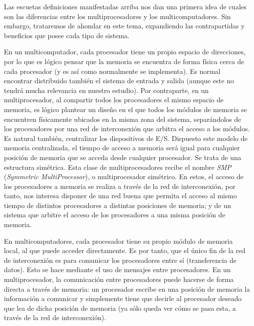 Las escuetas definiciones manifestadas arriba nos dan una primera idea de cuales son las diferencias entre los multiprocesadores y los multicomputadores. Sin embargo, trataremos de ahondar en este tema, expandiendo las contrapartidas y beneficios que posee cada tipo de sistema.

En un multicomputador, cada procesador tiene un propio espacio de direcciones, por lo que es lógico pensar que la memoria se encuentra de forma física cerca de cada procesador (y es así como normalmente se implementa). Es normal encontrar distribuido también el sistema de entrada y salida (aunque este no tendrá mucha relevancia en nuestro estudio). Por contraparte, en un multiprocesador, al compartir todos los procesadores el mismo espacio de memoria, es lógico plantear un diseño en el que todos los módulos de memoria se encuentren físicamente ubicados en la misma zona del sistema, separándolos de los procesadores por una red de interconexión que arbitra el acceso a los módulos. Es natural también, centralizar los dispositivos de E/S. Dispuesto este modelo de memoria centralizada, el tiempo de acceso a memoria será igual para cualquier posición de memoria que se acceda desde cualquier procesador. Se trata de una estructura simétrica. Esta clase de multiprocesadores recibe el nombre \emph{SMP} (\emph{Symmetric MultiProcessor}), o multiprocesador simétrico. En estos, el acceso de los procesadores a memoria se realiza a través de la red de interconexión, por tanto, nos interesa disponer de una red buena que permita el acceso al mismo tiempo de distintos procesadores a distintas posiciones de memoria; y de un sistema que arbitre el acceso de los procesadores a una misma posición de memoria.

En multicomputadores, cada procesador tiene su propio módulo de memoria local, al que puede acceder directamente. Es por tanto, que el único fin de la red de interconexión es para comunicar los procesadores entre sí (transferencia de datos). Esto se hace mediante el uso de mensajes entre procesadores. En un multiprocesador, la comunicación entre procesadores puede hacerse de forma directa a través de memoria: un procesador escribe en una posición de memoria la información a comunicar y simplemente tiene que decirle al procesador deseado que lea de dicha posición de memoria (ya sólo queda ver cómo se pasa esta, a través de la red de interconexión).

